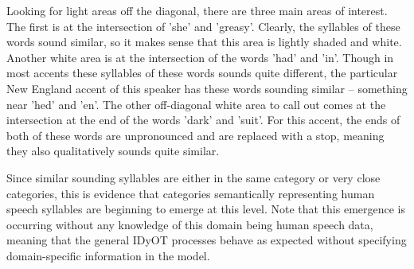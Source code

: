 Looking for light areas off the diagonal, there are three main areas of interest.  The first is at the intersection of 'she' and 'greasy'.  Clearly, the syllables of these words sound similar, so it makes sense that this area is lightly shaded and white.  Another white area is at the intersection of the words 'had' and 'in'.  Though in most accents these syllables of these words sounds quite different, the particular New England accent of this speaker has these words sounding similar -- something near 'hed' and 'en'. The other off-diagonal white area to call out comes at the intersection at the end of the words 'dark' and 'suit'.  For this accent, the ends of both of these words are unpronounced and are replaced with a stop, meaning they also qualitatively sounds quite similar.

Since similar sounding syllables are either in the same category or very close categories, this is evidence that categories semantically representing human speech syllables are beginning to emerge at this level.  Note that this emergence is occurring without any knowledge of this domain being human speech data, meaning that the general IDyOT processes behave as expected without specifying domain-specific information in the model.
